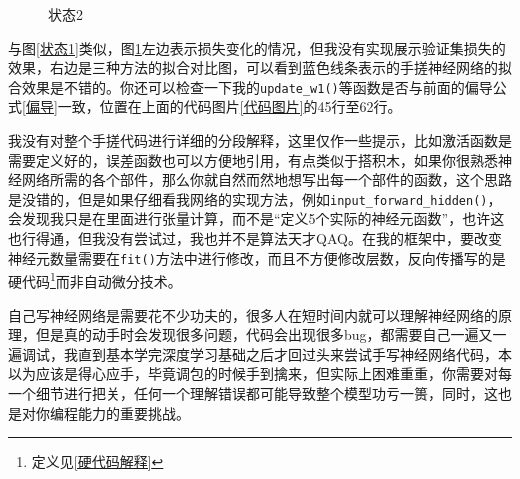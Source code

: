 \documentclass[a5paper, 11pt, openany]{book}
\begin{document}
\begin{figure}[h!]
    \centering
    \caption{状态2} \label{状态2}
\end{figure}

与图\ref{状态1}类似，图\ref{状态2}左边表示损失变化的情况，但我没有实现展示验证集损失的效果，右边是三种方法的拟合对比图，可以看到蓝色线条表示的手搓神经网络的拟合效果是不错的。你还可以检查一下我的\verb|update_w1()|等函数是否与前面的偏导公式\ref{偏导}一致，位置在上面的代码图片\ref{代码图片}的45行至62行。

我没有对整个手搓代码进行详细的分段解释，这里仅作一些提示，比如激活函数是需要定义好的，误差函数也可以方便地引用，有点类似于搭积木，如果你很熟悉神经网络所需的各个部件，那么你就自然而然地想写出每一个部件的函数，这个思路是没错的，但是如果仔细看我网络的实现方法，例如\verb|input_forward_hidden()|，会发现我只是在里面进行张量计算，而不是“定义5个实际的神经元函数”，也许这也行得通，但我没有尝试过，我也并不是算法天才QAQ。在我的框架中，要改变神经元数量需要在\verb|fit()|方法中进行修改，而且不方便修改层数，反向传播写的是硬代码\footnote{定义见\ref{硬代码解释}}而非自动微分技术。

自己写神经网络是需要花不少功夫的，很多人在短时间内就可以理解神经网络的原理，但是真的动手时会发现很多问题，代码会出现很多bug，都需要自己一遍又一遍调试，我直到基本学完深度学习基础之后才回过头来尝试手写神经网络代码，本以为应该是得心应手，毕竟调包的时候手到擒来，但实际上困难重重，你需要对每一个细节进行把关，任何一个理解错误都可能导致整个模型功亏一篑，同时，这也是对你编程能力的重要挑战。
\end{document}
